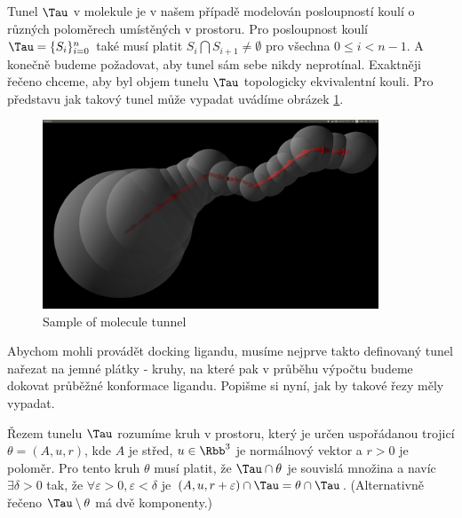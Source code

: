 Tunel $ \Tau $ v molekule je v našem případě modelován posloupností koulí o různých
poloměrech umístěných v prostoru. Pro posloupnost koulí $ \Tau = \{S_i\}_{i=0}^{n} $
také musí platit $ S_i \bigcap S_{i+1} \neq \emptyset $ pro všechna $ 0 \leq i < n - 1$.
A konečně budeme požadovat, aby tunel sám sebe nikdy neprotínal. Exaktněji řečeno
chceme, aby byl objem tunelu $ \Tau $ topologicky ekvivalentní kouli.
Pro představu jak takový tunel může vypadat uvádíme obrázek \ref{fig:basic_tunnel}.
\begin{figure}[ht]
  	\centering
	\includegraphics[width=100mm]{img/basic_tunnel.jpg}
	\caption{Sample of molecule tunnel}
  \centering
  \label{fig:basic_tunnel}
\end{figure}


Abychom mohli provádět docking ligandu, musíme nejprve takto definovaný tunel nařezat na
jemné plátky - kruhy, na které pak v průběhu výpočtu budeme dokovat průběžné konformace ligandu.
Popišme si nyní, jak by takové řezy měly vypadat.

\begin{defi}
Řezem tunelu $ \Tau $ rozumíme kruh v prostoru, který je určen uspořádanou trojicí
$\theta = (A, u, r)$, kde $ A $ je střed, $ u \in \Rbb^3 $ je normálnový vektor a $ r > 0 $ je poloměr.
Pro tento kruh $ \theta $ musí platit, že $ \Tau \cap \theta $ je souvislá množina a navíc
$ \exists \delta > 0 $ tak, že $ \forall \varepsilon > 0,  \varepsilon < \delta $ je
$ (A, u, r + \varepsilon) \cap \Tau = \theta \cap \Tau $.
(Alternativně řečeno $\Tau \setminus \theta $ má dvě komponenty.)
\end{defi}

